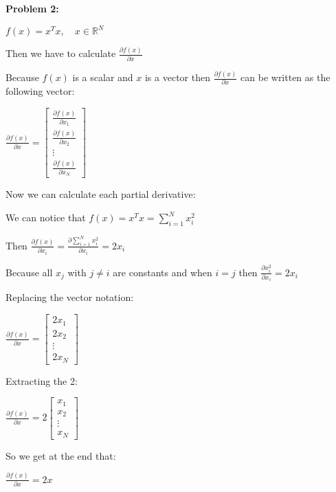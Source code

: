 \textbf{Problem 2:}

\singlespacing

$f(x) = x^Tx,\quad x \in \mathbb{R}^N$

\singlespacing

Then we have to calculate $\frac{\partial f(x)}{\partial x}$

\singlespacing

Because $f(x)$ is a scalar and $x$ is a vector then $\frac{\partial f(x)}{\partial x}$
can be written as the following vector:

\singlespacing

{
    \renewcommand{\arraystretch}{1.8}
    $\frac{\partial f(x)}{\partial x} = \begin{bmatrix}
            \frac{\partial f(x)}{\partial x_1} \\
            \frac{\partial f(x)}{\partial x_2} \\
            \vdots                             \\
            \frac{\partial f(x)}{\partial x_N}
        \end{bmatrix}$
}

\singlespacing

Now we can calculate each partial derivative:

\singlespacing

We can notice that $f(x) = x^Tx = \sum_{i=1}^{N}x_i^2$

\singlespacing

Then $\frac{\partial f(x)}{\partial x_i} = \frac{\partial \sum_{i=1}^{N}x_i^2}{\partial x_i} = 2x_i$

\singlespacing

Because all $x_j$ with $j \neq i$ are constants and when
$i = j$ then $\frac{\partial x_i^2}{\partial x_i} = 2x_i$

\singlespacing

Replacing the vector notation:

\singlespacing

{
    \renewcommand{\arraystretch}{1.8}
    $\frac{\partial f(x)}{\partial x} = \begin{bmatrix}
            2x_1   \\
            2x_2   \\
            \vdots \\
            2x_N
        \end{bmatrix}$
}

\singlespacing

Extracting the 2:

\singlespacing

{
    \renewcommand{\arraystretch}{1.8}
    $\frac{\partial f(x)}{\partial x} = 2\begin{bmatrix}
            x_1    \\
            x_2    \\
            \vdots \\
            x_N
        \end{bmatrix}$
}

\singlespacing

So we get at the end that:

\singlespacing

$\frac{\partial f(x)}{\partial x} = 2x$